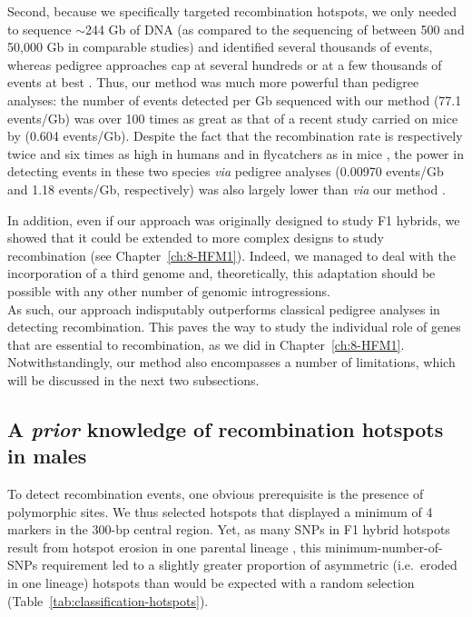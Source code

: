 Second, because we specifically targeted recombination hotspots, we only needed to sequence $\sim$244 Gb of DNA (as compared to the sequencing of between 500 and 50,000 Gb in comparable studies) and identified several thousands of events, whereas pedigree approaches cap at several hundreds \citep{halldorsson2016rate,smeds2016highresolution} or at a few thousands of events at best \citep{li2018highresolution}.
Thus, our method was much more powerful than pedigree analyses: the number of events detected per Gb sequenced with our method (77.1 events/Gb) was over 100 times as great as that of a recent study carried on mice by \citet{li2018highresolution} (0.604 events/Gb).
Despite the fact that the recombination rate is respectively twice and six times as high in humans and in flycatchers as in mice \citep{kawakami2014highdensity,kawakami2017wholegenome}, the power in detecting events in these two species \textit{via} pedigree analyses (0.00970 events/Gb and 1.18 events/Gb, respectively) was also largely lower than \textit{via} our method \citep{halldorsson2016rate, smeds2016highresolution}.

In addition, even if our approach was originally designed to study F1 hybrids, we showed that it could be extended to more complex designs to study recombination (see Chapter~\ref{ch:8-HFM1}).
Indeed, we managed to deal with the incorporation of a third genome and, theoretically, this adaptation should be possible with any other number of genomic introgressions.\\

As such, our approach indisputably outperforms classical pedigree analyses in detecting recombination.
This paves the way to study the individual role of genes that are essential to recombination, as we did in Chapter~\ref{ch:8-HFM1}.
Notwithstandingly, our method also encompasses a number of limitations, which will be discussed in the next two subsections. 



\subsection{A \textit{prior} knowledge of recombination hotspots in males}

To detect recombination events, one obvious prerequisite is the presence of polymorphic sites.
We thus selected hotspots that displayed a minimum of 4 markers in the 300-bp central region.
Yet, as many SNPs in F1 hybrid hotspots result from hotspot erosion in one parental lineage \citep{smagulova2016evolutionary}, this minimum-number-of-SNPs requirement led to a slightly greater proportion of asymmetric (i.e.\ eroded in one lineage) hotspots than would be expected with a random selection (Table~\ref{tab:classification-hotspots}).

